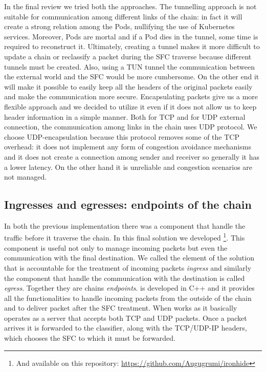 \vspace*{1cm}

\noindent In the final review we tried both the approaches. The tunnelling
approach is not suitable for communication among different links of the chain:
in fact it will create a strong relation among the Pods, nullifying the use of
Kubernetes services. Moreover, Pods are mortal and if a Pod dies in the tunnel,
some time is required to reconstruct it. Ultimately, creating a tunnel makes it
more difficult to update a chain or reclassify a packet during the SFC traverse
because different tunnels must be created. Also, using a TUN tunnel the
communication between the external world and the SFC would be more cumbersome.
On the other end it will make it possible to easily keep all the headers of the
original packets easily and make the communication more secure. Encapsulating
packets give us a more flexible approach and we decided to utilize it even if it
does not allow us to keep header information in a simple manner. Both for TCP
and for UDP external connection, the communication among links in the chain uses
UDP protocol. We choose UDP-encapsulation because this protocol removes some of
the TCP overhead: it does not implement any form of congestion avoidance
mechanisms and it does not create a connection among sender and receiver so
generally it has a lower latency. On the other hand it is unreliable and
congestion scenarios are not managed.

\subsection{Ingresses and egresses: endpoints of the chain}
\label{chap:impl:subsec:endpoints}
In both the previous implementation there was a component that handle the
traffic before it traverse the chain. In this final solution we developed 
\ironhide{}\footnote{And available on this repository: 
\url{https://github.com/Augugrumi/ironhide}}. This component is useful not only
to manage incoming packets but even the communication with the final
destination. We called the element of the solution that is accountable for the
treatment of incoming packets \emph{ingress} and similarly the component that
handle the communication with the destination is called \emph{egress}. Together
they are chains \emph{endpoints}. \ironhide{} is developed in C++ and it
provides all the functionalities to handle incoming packets from the outside of
the chain and to deliver packet after the SFC treatment. When \ironhide{} works
as \ingress{} it basically operates as a server that accepts both TCP and UDP
packets. Once a packet arrives it is forwarded to the classifier, along with the
TCP/UDP-IP headers, which chooses the SFC to which it must be forwarded.

